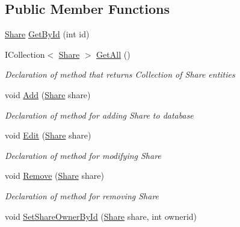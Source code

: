 \subsection*{Public Member Functions}
\begin{DoxyCompactItemize}
\item 
\mbox{\hyperlink{class_gielda_l2_1_1_d_b_1_1_entities_1_1_share}{Share}} \mbox{\hyperlink{interface_gielda_l2_1_1_d_b_1_1_interfaces_1_1_i_share_repository_af252fb27ec646e120265e2f71c83677a}{Get\+By\+Id}} (int id)
\item 
I\+Collection$<$ \mbox{\hyperlink{class_gielda_l2_1_1_d_b_1_1_entities_1_1_share}{Share}} $>$ \mbox{\hyperlink{interface_gielda_l2_1_1_d_b_1_1_interfaces_1_1_i_share_repository_a5e13f8b06cb4711bb54137dabf783ed1}{Get\+All}} ()
\begin{DoxyCompactList}\small\item\em Declaration of method that returns Collection of Share entities \end{DoxyCompactList}\item 
void \mbox{\hyperlink{interface_gielda_l2_1_1_d_b_1_1_interfaces_1_1_i_share_repository_a92f21844eefac0604d9d195aa1f15214}{Add}} (\mbox{\hyperlink{class_gielda_l2_1_1_d_b_1_1_entities_1_1_share}{Share}} share)
\begin{DoxyCompactList}\small\item\em Declaration of method for adding Share to database \end{DoxyCompactList}\item 
void \mbox{\hyperlink{interface_gielda_l2_1_1_d_b_1_1_interfaces_1_1_i_share_repository_a68449340553ab4702be8f3559ea50131}{Edit}} (\mbox{\hyperlink{class_gielda_l2_1_1_d_b_1_1_entities_1_1_share}{Share}} share)
\begin{DoxyCompactList}\small\item\em Declaration of method for modifying Share \end{DoxyCompactList}\item 
void \mbox{\hyperlink{interface_gielda_l2_1_1_d_b_1_1_interfaces_1_1_i_share_repository_a270dc411526d961bac26e1df19ae2563}{Remove}} (\mbox{\hyperlink{class_gielda_l2_1_1_d_b_1_1_entities_1_1_share}{Share}} share)
\begin{DoxyCompactList}\small\item\em Declaration of method for removing Share \end{DoxyCompactList}\item 
void \mbox{\hyperlink{interface_gielda_l2_1_1_d_b_1_1_interfaces_1_1_i_share_repository_a9670fbeb44bb7ac102fdff4b6a38e24f}{Set\+Share\+Owner\+By\+Id}} (\mbox{\hyperlink{class_gielda_l2_1_1_d_b_1_1_entities_1_1_share}{Share}} share, int ownerid)

\end{DoxyCompactItemize}
